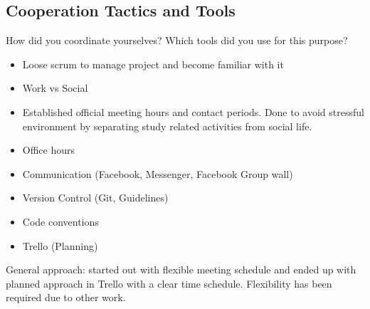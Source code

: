 \subsection{Cooperation Tactics and Tools}

How did you coordinate yourselves? Which tools did you use for this purpose?

\begin{itemize}
	\item Loose scrum to manage project and become familiar with it
	\item Work vs Social 
	\item Established official meeting hours and contact periods. Done to avoid stressful environment by separating study related activities from social life.
	\item Office hours 
	\item Communication (Facebook, Messenger, Facebook Group wall)
	\item Version Control (Git, Guidelines)
	\item Code conventions 
	\item Trello (Planning) 
\end{itemize}

General approach: started out with flexible meeting schedule and ended up with planned approach in Trello with a clear time schedule. Flexibility has been required due to other work.